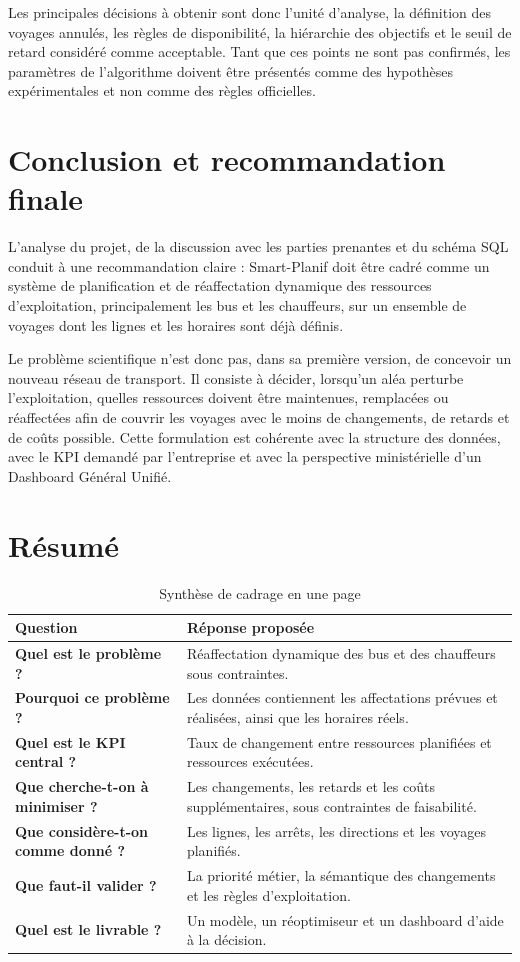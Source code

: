\documentclass[12pt,a4paper]{article}
\begin{document}
Les principales décisions à obtenir sont donc l’unité d’analyse, la définition des voyages annulés, les règles de disponibilité, la hiérarchie des objectifs et le seuil de retard considéré comme acceptable. Tant que ces points ne sont pas confirmés, les paramètres de l’algorithme doivent être présentés comme des hypothèses expérimentales et non comme des règles officielles.

\section{Conclusion et recommandation finale}

L’analyse du projet, de la discussion avec les parties prenantes et du schéma SQL conduit à une recommandation claire : Smart-Planif doit être cadré comme un système de planification et de réaffectation dynamique des ressources d’exploitation, principalement les bus et les chauffeurs, sur un ensemble de voyages dont les lignes et les horaires sont déjà définis.

Le problème scientifique n’est donc pas, dans sa première version, de concevoir un nouveau réseau de transport. Il consiste à décider, lorsqu’un aléa perturbe l’exploitation, quelles ressources doivent être maintenues, remplacées ou réaffectées afin de couvrir les voyages avec le moins de changements, de retards et de coûts possible. Cette formulation est cohérente avec la structure des données, avec le KPI demandé par l’entreprise et avec la perspective ministérielle d’un Dashboard Général Unifié.


\appendix
\newpage
\section{Résumé}

\begin{table}[ht]
\centering
\caption{Synthèse de cadrage en une page}
\begin{tabularx}{\textwidth}{>{\bfseries}p{4cm} X}
\toprule
Question & Réponse proposée \\
\midrule
Quel est le problème ? & Réaffectation dynamique des bus et des chauffeurs sous contraintes. \\
Pourquoi ce problème ? & Les données contiennent les affectations prévues et réalisées, ainsi que les horaires réels. \\
Quel est le KPI central ? & Taux de changement entre ressources planifiées et ressources exécutées. \\
Que cherche-t-on à minimiser ? & Les changements, les retards et les coûts supplémentaires, sous contraintes de faisabilité. \\
Que considère-t-on comme donné ? & Les lignes, les arrêts, les directions et les voyages planifiés. \\
Que faut-il valider ? & La priorité métier, la sémantique des changements et les règles d’exploitation. \\
Quel est le livrable ? & Un modèle, un réoptimiseur et un dashboard d’aide à la décision. \\
\bottomrule
\end{tabularx}
\end{table}
\end{document}
